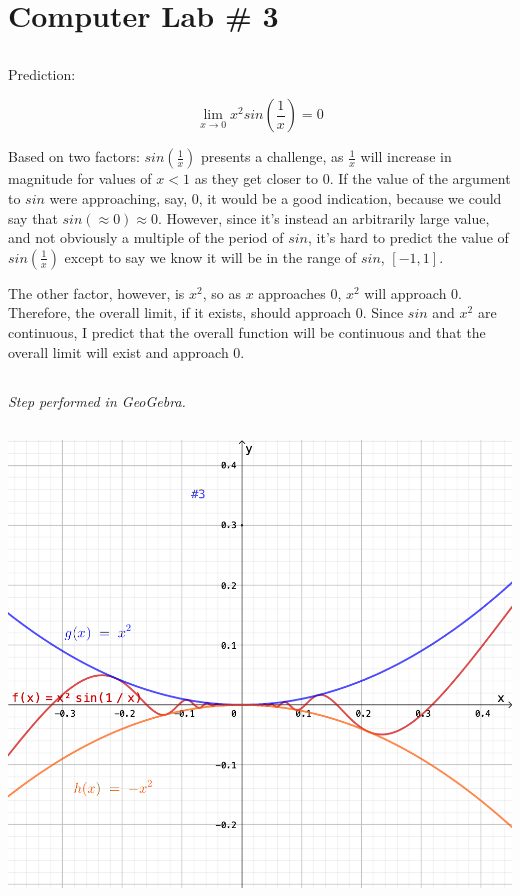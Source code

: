 \documentclass{article}
\begin{document}
\section*{Computer Lab \# 3}

\subsection{}
Prediction:

$$ \lim_{x \rightarrow 0} x^2 sin(\frac{1}{x}) = \boxed{0} $$

Based on two factors: $sin(\frac{1}{x})$ presents a challenge, as $\frac{1}{x}$ will increase in magnitude for values of $x < 1$ as they get closer to 0. If the value of the argument to $sin$ were approaching, say, 0, it would be a good indication, because we could say that $sin(\approx0) \approx 0$. However, since it's instead an arbitrarily large value, and not obviously a multiple of the period of $sin$, it's hard to predict the value of $sin(\frac{1}{x})$ except to say we know it will be in the range of $sin$, $[-1,1]$.

The other factor, however, is $x^2$, so as $x$ approaches 0, $x^2$ will approach 0. Therefore, the overall limit, if it exists, should approach $0$. Since $sin$ and $x^2$ are continuous, I predict that the overall function will be continuous and that the overall limit will exist and approach 0.

\subsection{}
\emph{Step performed in GeoGebra.}

\subsection{}
\includegraphics[width=\textwidth]{cl3-3}
\end{document}
